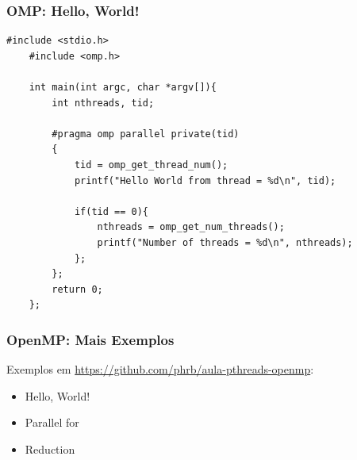 \documentclass[10pt, compress]{beamer}
\begin{document}
\begin{frame}[fragile]
    \frametitle{OMP: Hello, World!}
    \begin{lstlisting}[basicstyle=\ttfamily\scriptsize]
    #include <stdio.h>
    #include <omp.h>

    int main(int argc, char *argv[]){
        int nthreads, tid;

        #pragma omp parallel private(tid)
        {
            tid = omp_get_thread_num();
            printf("Hello World from thread = %d\n", tid);

            if(tid == 0){
                nthreads = omp_get_num_threads();
                printf("Number of threads = %d\n", nthreads);
            };
        };
        return 0;
    };
    \end{lstlisting}
\end{frame}

\begin{frame}
    \frametitle{OpenMP: Mais Exemplos}
    Exemplos em \url{https://github.com/phrb/aula-pthreads-openmp}:
    \begin{itemize}
        \item Hello, World!
        \item Parallel for
        \item Reduction
    \end{itemize}
\end{frame}

\maketitle
\end{document}
